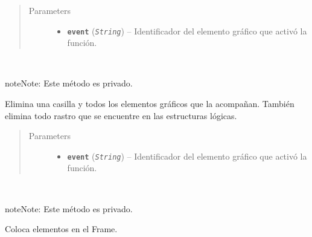 \documentclass[class=report, crop=false]{standalone}
\begin{document}
\begin{fulllineitems}
\begin{fulllineitems}
\begin{quote}\begin{description}
\item[{Parameters}] \leavevmode\begin{itemize}
\item \textbf{\texttt{event}} (\emph{\texttt{String}}) -- Identificador del elemento gráfico que activó la función.
\end{itemize}
\end{description}\end{quote}

\end{fulllineitems}

\begin{fulllineitems}

~

\begin{notice}{note}{Note:}
Este método es privado.
\end{notice}

Elimina una casilla y todos los elementos gráficos que 
la acompañan.\break
También elimina todo rastro que se encuentre en las 
estructuras lógicas.

\begin{quote}\begin{description}
\item[{Parameters}] \leavevmode\begin{itemize}
\item \textbf{\texttt{event}} (\emph{\texttt{String}}) -- Identificador del elemento gráfico que activó la función.
\end{itemize}
\end{description}\end{quote}

\end{fulllineitems}

\begin{fulllineitems}

~

\begin{notice}{note}{Note:}
Este método es privado.
\end{notice}

Coloca elementos en el Frame.

\end{fulllineitems}


\end{fulllineitems}
\end{document}

